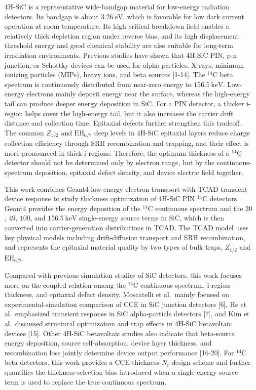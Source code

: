 \documentclass[
  10pt,
  a4paper,
]{article}
\begin{document}
4H-SiC is a representative wide-bandgap material for low-energy
radiation detectors. Its bandgap is about \(3.26\ \mathrm{eV}\), which
is favorable for low dark current operation at room temperature. Its
high critical breakdown field enables a relatively thick depletion
region under reverse bias, and its high displacement threshold energy
and good chemical stability are also suitable for long-term irradiation
environments. Previous studies have shown that 4H-SiC PIN, p-n junction,
or Schottky devices can be used for alpha particles, X-rays, minimum
ionizing particles (MIPs), heavy ions, and beta sources {[}1-14{]}. The
\(^{14}\mathrm{C}\) beta spectrum is continuously distributed from
near-zero energy to \(156.5\ \mathrm{keV}\). Low-energy electrons mainly
deposit energy near the surface, whereas the high-energy tail can
produce deeper energy deposition in SiC. For a PIN detector, a thicker
i-region helps cover the high-energy tail, but it also increases the
carrier drift distance and collection time. Epitaxial defects further
strengthen this tradeoff. The common \(Z_{1/2}\) and
\(\mathrm{EH}_{6/7}\) deep levels in 4H-SiC epitaxial layers reduce
charge collection efficiency through SRH recombination and trapping, and
their effect is more pronounced in thick i-regions. Therefore, the
optimum thickness of a \(^{14}\mathrm{C}\) detector should not be
determined only by electron range, but by the continuous-spectrum
deposition, epitaxial defect density, and device electric field
together.

This work combines Geant4 low-energy electron transport with TCAD
transient device response to study thickness optimization of 4H-SiC PIN
\(^{14}\mathrm{C}\) detectors. Geant4 provides the energy deposition of
the \(^{14}\mathrm{C}\) continuous spectrum and the \(20\), \(49\),
\(100\), and \(156.5\ \mathrm{keV}\) single-energy source terms in SiC,
which is then converted into carrier-generation distributions in TCAD.
The TCAD model uses key physical models including drift-diffusion
transport and SRH recombination, and represents the epitaxial material
quality by two types of bulk traps, \(Z_{1/2}\) and
\(\mathrm{EH}_{6/7}\).

Compared with previous simulation studies of SiC detectors, this work
focuses more on the coupled relation among the \(^{14}\mathrm{C}\)
continuous spectrum, i-region thickness, and epitaxial defect density.
Moscatelli et al.~mainly focused on experimental-simulation comparison
of CCE in SiC junction detectors {[}6{]}, He et al.~emphasized transient
response in SiC alpha-particle detectors {[}7{]}, and Kim et
al.~discussed structural optimization and trap effects in 4H-SiC
betavoltaic devices {[}15{]}. Other 4H-SiC betavoltaic studies also
indicate that beta-source energy deposition, source self-absorption,
device layer thickness, and recombination loss jointly determine device
output performance {[}16-20{]}. For \(^{14}\mathrm{C}\) beta detectors,
this work provides a CCE-thickness-\(N_t\) design scheme and further
quantifies the thickness-selection bias introduced when a single-energy
source term is used to replace the true continuous spectrum.
\end{document}
